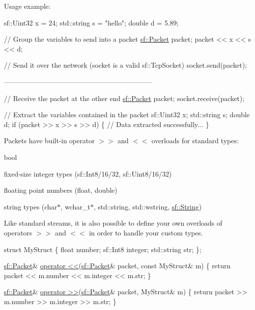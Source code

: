 Usage example\+: 
\begin{DoxyCode}
sf::Uint32 x = 24;
std::string s = \textcolor{stringliteral}{"hello"};
\textcolor{keywordtype}{double} d = 5.89;

\textcolor{comment}{// Group the variables to send into a packet}
\hyperlink{classsf_1_1Packet}{sf::Packet} packet;
packet << x << s << d;

\textcolor{comment}{// Send it over the network (socket is a valid sf::TcpSocket)}
socket.send(packet);

-----------------------------------------------------------------

\textcolor{comment}{// Receive the packet at the other end}
\hyperlink{classsf_1_1Packet}{sf::Packet} packet;
socket.receive(packet);

\textcolor{comment}{// Extract the variables contained in the packet}
sf::Uint32 x;
std::string s;
\textcolor{keywordtype}{double} d;
\textcolor{keywordflow}{if} (packet >> x >> s >> d)
\{
    \textcolor{comment}{// Data extracted successfully...}
\}
\end{DoxyCode}


Packets have built-\/in operator $>$$>$ and $<$$<$ overloads for standard types\+: \begin{DoxyItemize}
\item bool \item fixed-\/size integer types (sf\+::\+Int8/16/32, sf\+::\+Uint8/16/32) \item floating point numbers (float, double) \item string types (char$\ast$, wchar\+\_\+t$\ast$, std\+::string, std\+::wstring, \hyperlink{classsf_1_1String}{sf\+::\+String})\end{DoxyItemize}
Like standard streams, it is also possible to define your own overloads of operators $>$$>$ and $<$$<$ in order to handle your custom types.


\begin{DoxyCode}
\textcolor{keyword}{struct }MyStruct
\{
    \textcolor{keywordtype}{float}       number;
    sf::Int8    integer;
    std::string str;
\};

\hyperlink{classsf_1_1Packet}{sf::Packet}& \hyperlink{classsf_1_1Packet_aa5a465ed02ba29d83ecdafb0ac3fff21}{operator <<}(\hyperlink{classsf_1_1Packet}{sf::Packet}& packet, \textcolor{keyword}{const} MyStruct& m)
\{
    \textcolor{keywordflow}{return} packet << m.number << m.integer << m.str;
\}

\hyperlink{classsf_1_1Packet}{sf::Packet}& \hyperlink{classsf_1_1Packet_af8e26c63ba9bdccd262565ff0d3eeba2}{operator >>}(\hyperlink{classsf_1_1Packet}{sf::Packet}& packet, MyStruct& m)
\{
    \textcolor{keywordflow}{return} packet >> m.number >> m.integer >> m.str;
\}
\end{DoxyCode}


